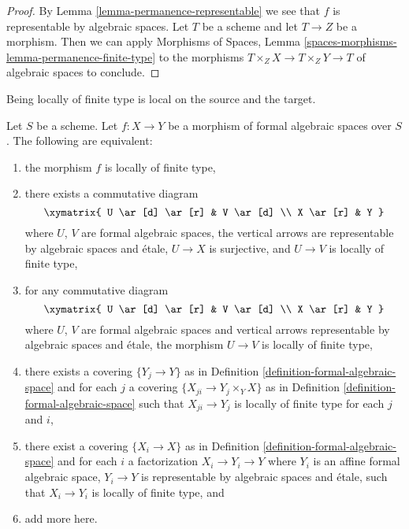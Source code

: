 \begin{proof}
By Lemma \ref{lemma-permanence-representable} we see that $f$ is
representable by algebraic spaces. Let $T$ be a scheme and let
$T \to Z$ be a morphism. Then we can apply
Morphisms of Spaces, Lemma \ref{spaces-morphisms-lemma-permanence-finite-type}
to the morphisms
$T \times_Z X \to T \times_Z Y \to T$ of algebraic spaces to conclude.
\end{proof}

\noindent
Being locally of finite type is local on the source and the target.

\begin{lemma}
\label{lemma-finite-type-local}
Let $S$ be a scheme. Let $f : X \to Y$ be a morphism of formal algebraic
spaces over $S$. The following are equivalent:
\begin{enumerate}
\item the morphism $f$ is locally of finite type,
\item there exists a commutative diagram
$$
\xymatrix{
U \ar[d] \ar[r] & V \ar[d] \\
X \ar[r] & Y
}
$$
where $U$, $V$ are formal algebraic spaces, the vertical arrows are
representable by algebraic spaces and \'etale, $U \to X$
is surjective, and $U \to V$ is locally of finite type,
\item for any commutative diagram
$$
\xymatrix{
U \ar[d] \ar[r] & V \ar[d] \\
X \ar[r] & Y
}
$$
where $U$, $V$ are formal algebraic spaces and vertical arrows
representable by algebraic spaces and \'etale, the morphism
$U \to V$ is locally of finite type,
\item there exists a covering $\{Y_j \to Y\}$ as in
Definition \ref{definition-formal-algebraic-space}
and for each $j$ a covering $\{X_{ji} \to Y_j \times_Y X\}$ as in
Definition \ref{definition-formal-algebraic-space} such that
$X_{ji} \to Y_j$ is locally of finite type for each $j$ and $i$,
\item there exist a covering $\{X_i \to X\}$ as in
Definition \ref{definition-formal-algebraic-space}
and for each $i$ a factorization $X_i \to Y_i \to Y$ where $Y_i$
is an affine formal algebraic space, $Y_i \to Y$ is representable
by algebraic spaces and \'etale, such that $X_i \to Y_i$ is
locally of finite type, and
\item add more here.
\end{enumerate}
\end{lemma}


